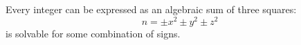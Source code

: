 \begin{proposition}
Every integer can be expressed as an algebraic sum of three squares:
\[
    n=\pm x^2\pm y^2\pm z^2
\]
is solvable for some combination of signs.
\end{proposition}
